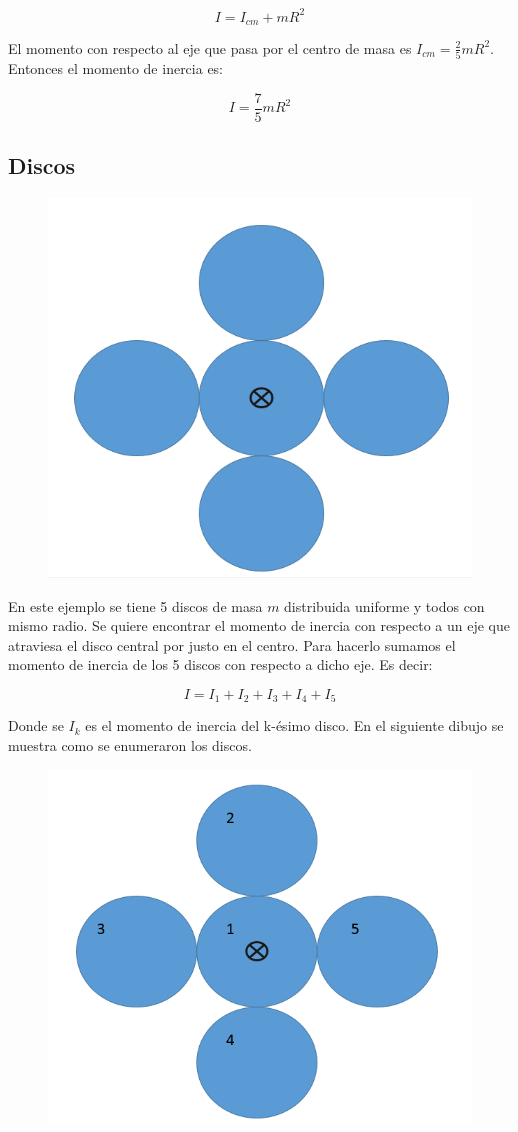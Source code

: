 \documentclass[a4paper,11pt]{article}
\theoremstyle{mytheor}
\begin{document}
$$ I = I_{cm} + m R^2$$

El momento con respecto al eje que pasa por el centro de masa es $I_{cm} =\frac{2}{5} m R^2$. Entonces el momento de inercia es:

$$ I = \frac{7}{5} m R^2$$

\subsection{Discos}

\begin{figure}[h]
	\includegraphics[width=0.4\linewidth]{parelelodiscos}
	\label{fcN4}
\end{figure}

En este ejemplo se tiene 5 discos de masa $m$ distribuida uniforme y todos con mismo radio. Se quiere encontrar el momento de inercia con respecto a un eje que atraviesa el disco central por justo en el centro. Para hacerlo sumamos el momento de inercia de los 5 discos con respecto a dicho eje. Es decir:

$$ I = I_1 + I_2 + I_3 + I_4 + I_5$$

Donde se $I_k$ es el momento de inercia del k-ésimo disco. En el siguiente dibujo se muestra como se enumeraron los discos.
\begin{figure}[h]
	\includegraphics[width=0.6\linewidth]{numerados}
	\label{fcN4}
\end{figure}
\end{document}
